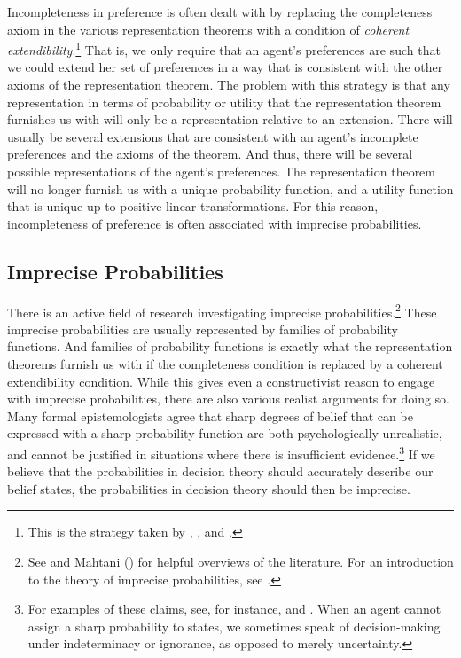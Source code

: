 Incompleteness in preference is often dealt with by replacing the completeness axiom in the various representation theorems with a condition of {\em coherent extendibility}.\footnote{This is the strategy taken by \citet{Kaplan1983}, \citet{Jeffrey1983}, and \citet{Joyce1999}.} That is, we only require that an agent's preferences are such that we could extend her set of preferences in a way that is consistent with the other axioms of the representation theorem. The problem with this strategy is that any representation in terms of probability or utility that the representation theorem furnishes us with will only be a representation relative to an extension. There will usually be several extensions that are consistent with an agent's incomplete preferences and the axioms of the theorem. And thus, there will be several possible representations of the agent's preferences. The representation theorem will no longer furnish us with a unique probability function, and a utility function that is unique up to positive linear transformations. For this reason, incompleteness of preference is often associated with imprecise probabilities.

\subsection{Imprecise Probabilities}\label{subs42}

There is an active field of research investigating imprecise probabilities.\footnote{See \citet{Bradley2015} and Mahtani () for helpful overviews of the literature. For an introduction to the theory of imprecise probabilities, see \citet{Augustin2014}.} These imprecise probabilities are usually represented by families of probability functions. And families of probability functions is exactly what the representation theorems furnish us with if the completeness condition is replaced by a coherent extendibility condition. While this gives even a constructivist reason to engage with imprecise probabilities, there are also various realist arguments for doing so. Many formal epistemologists agree that sharp degrees of belief that can be expressed with a sharp probability function are both psychologically unrealistic, and cannot be justified in situations where there is insufficient evidence.\footnote{For examples of these claims, see, for instance, \citet{Levi1980} and \citet{Kaplan1996}. When an agent cannot assign a sharp probability to states, we sometimes speak of decision-making under indeterminacy or ignorance, as opposed to merely uncertainty.} If we believe that the probabilities in decision theory should accurately describe our belief states, the probabilities in decision theory should then be imprecise.

